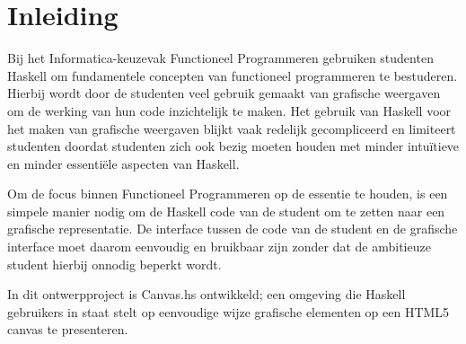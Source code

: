 \chapter{Inleiding}
Bij het Informatica-keuzevak Functioneel Programmeren gebruiken studenten Haskell om fundamentele concepten van functioneel programmeren te bestuderen. Hierbij wordt door de studenten veel gebruik gemaakt van grafische weergaven om de werking van hun code inzichtelijk te maken. Het gebruik van Haskell voor het maken van grafische weergaven blijkt vaak redelijk gecompliceerd en  limiteert studenten doordat studenten zich ook bezig moeten houden met minder intuïtieve en minder essentiële aspecten van Haskell. 

Om de focus binnen Functioneel Programmeren op de essentie te houden, is een simpele manier nodig om de Haskell code van de student om te zetten naar een grafische representatie. De interface tussen de code van de student en de grafische interface moet daarom eenvoudig en bruikbaar zijn zonder dat de ambitieuze student hierbij onnodig beperkt wordt.

In dit ontwerpproject is Canvas.hs ontwikkeld; een omgeving die Haskell gebruikers in staat stelt op eenvoudige wijze grafische elementen op een HTML5 canvas te presenteren. 
